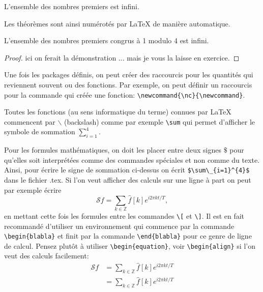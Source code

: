 \begin{theorem}
 L'ensemble des nombres premiers est infini.
\end{theorem}
Les théorèmes  sont ainsi numérotés par \LaTeX{} de manière automatique.

\begin{theorem}
 L'ensemble des nombres premiers congrus à 1 modulo 4 est infini.
\end{theorem}

\begin{proof}
 ici on ferait la démonstration ... mais  je vous la laisse en exercice.
\end{proof}

Une fois les packages définis, on peut créer des raccourcis pour les quantités qui reviennent 
souvent ou des fonctions. Par exemple, on peut définir un raccourcis pour la commande qui créée une 
fonction: \lstinline+\newcommand{\nc}{\newcommand}+.

\begin{rem}
 Toutes les fonctions (au sens informatique du terme) connues par \LaTeX{} commencent par $\backslash$ 
(backslash) comme par exemple \lstinline+\sum+
 qui permet d'afficher le symbole de sommation $\sum_{i=1}^{4}$. 
\end{rem}


Pour les formules mathématiques, on doit les placer entre deux signes 
$\$$ pour qu'elles soit interprétées comme des commandes spéciales et non comme du texte. 
Ainsi, pour écrire le signe de sommation ci-dessus on écrit \lstinline+$\sum\_{i=1}^{4}$+ dans le 
fichier .tex. Si l'on veut afficher des calculs sur une ligne à part on peut par exemple écrire 
\[\mathcal{S}f = \sum_{k\in\mathbb{Z}} \hat{f}[k] e^{i2\pi kt/T}, \] 
en mettant cette fois les formules  entre  les commandes 
\lstinline+\[+ et \lstinline+\]+. Il est en fait recommandé d'utiliser un environnement qui commence par la 
commande 
\lstinline+\begin{blabla}+ et finit par la commande \lstinline+\end{blabla}+ pour ce genre de ligne de calcul.
Pensez plut\^ot \`a utiliser \lstinline+\begin{equation}+, voir \lstinline+\begin{align}+ 
si l'on veut des calculs facilement:
\begin{align}
 \mathcal{S}f & = \sum_{k\in\mathbb{Z}} \hat f[k] e^{i2\pi kt/T} \label{nomformule}\\
  & = \sum_{k\in\mathbb{Z}} \hat f[k] e^{i2\pi kt/T}
\end{align}

